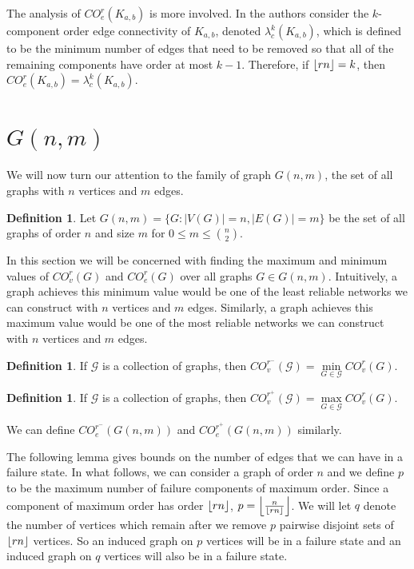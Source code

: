 \documentclass[12pt]{article}
\DeclarePairedDelimiter{\floor}{\lfloor}{\rfloor}
\theoremstyle{definition}
\newtheorem{definition}[theorem]{Definition}
\newcommand{\COV}[2]{CO^{#1}_{v}(#2)}
\newcommand{\COE}[2]{CO^{#1}_{e}(#2)}
\newcommand{\COVMAX}[1]{CO^{r^+}_{v}(#1)}
\newcommand{\COEMAX}[1]{CO^{r^+}_{e}(#1)}
\newcommand{\COVMIN}[1]{CO^{r^-}_{v}(#1)}
\newcommand{\COEMIN}[1]{CO^{r^-}_{e}(#1)}
\begin{document}
The analysis of $\COE{r}{K_{a,b}}$ is more involved. In \cite{COCBipartite} the authors consider the $k$-component order edge connectivity of $K_{a,b}$, denoted $\lambda_c^k(K_{a,b})$, which is defined to be the minimum number of edges that need to be removed so that all of the remaining components have order at most $k-1$. Therefore, if $\floor{rn}=k$, then $\COE{r}{K_{a,b}} = \lambda_c^k(K_{a,b})$. 



\section{$G(n,m)$}

We will now turn our attention to the family of graph $G(n,m)$, the set of all graphs with $n$ vertices and $m$ edges.  

\begin{definition}
Let $G(n,m)=\{G: |V(G)|=n, |E(G)|=m \}$ be the set of all graphs of order $n$ and size $m$ for $0 \leq m \leq \binom{n}{2}.$
\end{definition}

In this section we will be concerned with finding the maximum and minimum values of $\COV{r}{G}$ and $\COE{r}{G}$ over all graphs $G \in G(n,m)$. Intuitively, a graph achieves this minimum value would be one of the least reliable networks we can construct with $n$ vertices and $m$ edges.  Similarly, a graph achieves this maximum value would be one of the most reliable networks we can construct with $n$ vertices and $m$ edges. 


\begin{definition}
If $\mathcal G$ is a collection of graphs, then $\COVMIN{\mathcal G}= \min\limits_{G \in \mathcal G} \COV{r}{G}$.
\end{definition}


\begin{definition}
If $\mathcal G$ is a collection of graphs, then $\COVMAX{\mathcal G}= \max\limits_{G \in \mathcal G} \COV{r}{G}$.
\end{definition}
  
We can define $\COEMIN{G(n,m)}$ and $\COEMAX{G(n,m)}$ similarly. 

The following lemma gives bounds on the number of edges that we can have in a failure state. In what follows, we can consider a graph of order $n$ and we define $p$ to be the maximum number of failure components of maximum order. Since a component of maximum order has order $\floor{rn}$, $p = \left\lfloor \frac{n}{\floor{rn}}\right\rfloor$. We will let $q$ denote the number of vertices which remain after we remove $p$ pairwise disjoint sets of $\floor{rn}$ vertices. So an induced graph on $p$ vertices will be in a failure state and an induced graph on $q$ vertices will also be in a failure state.  
\end{document}
